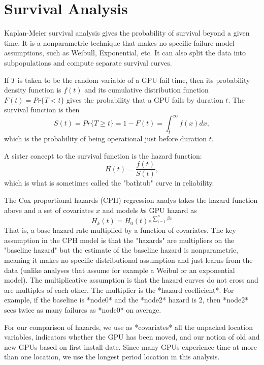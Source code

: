 \section{Survival Analysis}
\label{sec:survival}


Kaplan-Meier survival analysis gives the probability of survival beyond a given time. It is a nonparametric technique that makes no specific failure model assumptions, such as Weibull, Exponential, etc. It can also split the data into subpopulations and compute separate survival curves.

If $T$ is taken to be the random variable of a GPU fail time, then its probability density function is $f(t)$ and its cumulative distribution function $F(t) = Pr\{T < t\}$ gives the probability that a GPU fails by duration $t$. The survival function is then
\begin{displaymath}
  S(t) = Pr\{T \geq t\} = 1 - F(t) = \int_t^\infty f(x)dx,
\end{displaymath}
which is the probability of being operational just before duration $t$.

A sister concept to the survival function is the hazard function:
\begin{displaymath}
  H(t) = \frac{f(t)}{S(t)},
\end{displaymath}
which is what is sometimes called the "bathtub" curve in reliability.


The Cox proportional hazards (CPH) regression analys \cite{Cox1972,Harrell2015} takes the hazard function above and a set of covariates $x$ and models $k$s GPU hazard as
\begin{displaymath}
  H_k(t) = H_0(t)e^{\sum\limits_{i=1}^n{\beta x}}
\end{displaymath}
That is, a base hazard rate multiplied by a function of
covariates. The key assumption in the CPH model is that the "hazards"
are multipliers on the "baseline hazard" but the estimate of the
baseline hazard is nonparametric, meaning it makes no specific
distributional assumption and just learns from the data (unlike
analyses that assume for example a Weibul or an exponential
model). The multiplicative assumption is that the hazard curves do not
cross and are multiples of each other. The multiplier is the *hazard
coefficient*. For example, if the baseline is *node0* and the *node2*
hazard is 2, then *node2* sees twice as many failures as *node0* on
average. 

For our comparison of hazards, we use as *covariates* all the unpacked
location variables, indicators whether the GPU has been moved, and our
notion of old and new GPUs based on first install date. Since many
GPUs experience time at more than one location, we use the longest
period location in this analysis. 

